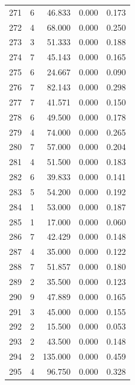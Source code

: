 \begin{table}
\begin{tabular}{rrrrr}
 271 &      6 &         46.833 &        0.000 &           0.173 \\
 272 &      4 &         68.000 &        0.000 &           0.250 \\
 273 &      3 &         51.333 &        0.000 &           0.188 \\
 274 &      7 &         45.143 &        0.000 &           0.165 \\
 275 &      6 &         24.667 &        0.000 &           0.090 \\
 276 &      7 &         82.143 &        0.000 &           0.298 \\
 277 &      7 &         41.571 &        0.000 &           0.150 \\
 278 &      6 &         49.500 &        0.000 &           0.178 \\
 279 &      4 &         74.000 &        0.000 &           0.265 \\
 280 &      7 &         57.000 &        0.000 &           0.204 \\
 281 &      4 &         51.500 &        0.000 &           0.183 \\
 282 &      6 &         39.833 &        0.000 &           0.141 \\
 283 &      5 &         54.200 &        0.000 &           0.192 \\
 284 &      1 &         53.000 &        0.000 &           0.187 \\
 285 &      1 &         17.000 &        0.000 &           0.060 \\
 286 &      7 &         42.429 &        0.000 &           0.148 \\
 287 &      4 &         35.000 &        0.000 &           0.122 \\
 288 &      7 &         51.857 &        0.000 &           0.180 \\
 289 &      2 &         35.500 &        0.000 &           0.123 \\
 290 &      9 &         47.889 &        0.000 &           0.165 \\
 291 &      3 &         45.000 &        0.000 &           0.155 \\
 292 &      2 &         15.500 &        0.000 &           0.053 \\
 293 &      2 &         43.500 &        0.000 &           0.148 \\
 294 &      2 &        135.000 &        0.000 &           0.459 \\
 295 &      4 &         96.750 &        0.000 &           0.328 \\

\end{tabular}
\end{table}
